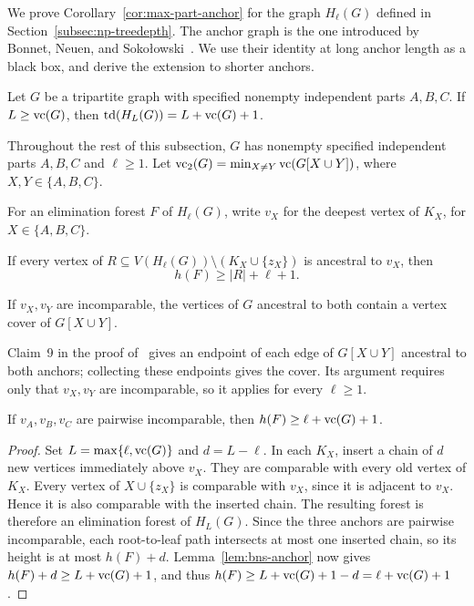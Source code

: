We prove Corollary~\ref{cor:max-part-anchor} for the graph
$H_\ell(G)$ defined in Section~\ref{subsec:np-treedepth}. The anchor
graph is the one introduced by Bonnet, Neuen, and
Soko\l owski~\cite[Lemma~6]{BNS}. We use their identity at long anchor
length as a black box, and derive the extension to shorter anchors.

\begin{lemma}
\label{lem:bns-anchor}
Let $G$ be a tripartite graph with specified nonempty independent parts
$A,B,C$. If $L\ge\operatorname{vc}(G)$, then
$\operatorname{td}(H_L(G))=L+\operatorname{vc}(G)+1$.
\end{lemma}

Throughout the rest of this subsection, $G$ has nonempty specified
independent parts $A,B,C$ and $\ell\ge1$. Let
$\operatorname{vc}_2(G)=\min_{X\ne Y}\operatorname{vc}(G[X\cup Y])$, where
$X,Y\in\{A,B,C\}$.

For an elimination forest $F$ of $H_\ell(G)$, write $v_X$
for the deepest vertex of $K_X$, for $X\in\{A,B,C\}$.

\begin{lemma}\label{lem:anchor-path}
If every vertex of
$R\subseteq V(H_\ell(G))\setminus(K_X\cup\{z_X\})$ is ancestral
to $v_X$, then
\begin{equation}\label{eq:anchor-path-bound}
 h(F)\ge |R|+\ell+1.
\end{equation}
\end{lemma}

\begin{lemma}\label{lem:anchor-pair-cover}
If $v_X,v_Y$ are incomparable, the vertices of $G$ ancestral to both
contain a vertex cover of $G[X\cup Y]$.
\end{lemma}

Claim~9 in the proof of~\cite[Lemma~6]{BNS} gives an endpoint of
each edge of $G[X\cup Y]$ ancestral to both anchors; collecting
these endpoints gives the cover. Its argument requires only that
$v_X,v_Y$ are incomparable, so it applies for every $\ell\ge1$.

\begin{lemma}\label{lem:incomparable-anchor-extension}
If $v_A,v_B,v_C$ are pairwise incomparable, then
$h(F)\ge\ell+\operatorname{vc}(G)+1$.
\end{lemma}

\begin{proof}
Set $L=\max\{\ell,\operatorname{vc}(G)\}$ and
$d=L-\ell$. In each $K_X$, insert a chain of $d$ new vertices
immediately above $v_X$. They are comparable with every old
vertex of $K_X$. Every vertex of $X\cup\{z_X\}$ is comparable
with $v_X$, since it is adjacent to $v_X$. Hence it is
also comparable with the inserted chain. The resulting forest is
therefore an elimination forest of $H_L(G)$. Since the three
anchors are pairwise incomparable, each root-to-leaf path intersects
at most one inserted chain, so its height is at most $h(F)+d$.
Lemma~\ref{lem:bns-anchor} now gives
$h(F)+d\ge L+\operatorname{vc}(G)+1$, and thus
$h(F)\ge L+\operatorname{vc}(G)+1-d=\ell+\operatorname{vc}(G)+1$.
\end{proof}


